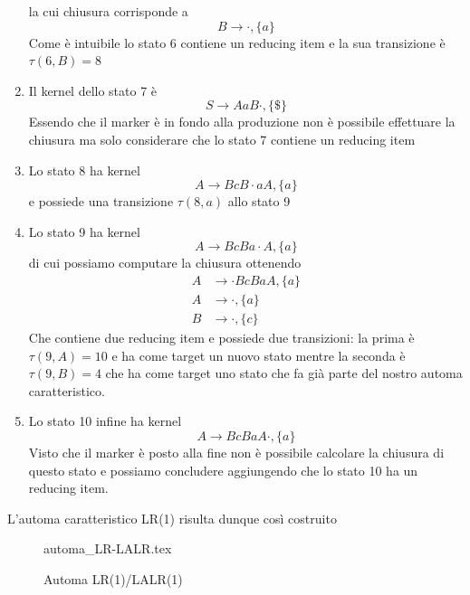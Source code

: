 \documentclass[class=book, crop=false, oneside, 12pt]{standalone}
\begin{document}
\begin{enumerate}
    la cui chiusura corrisponde a 
    \begin{equation*}
         B \to \cdot, \{a\} 
    \end{equation*}
    Come è intuibile lo stato 6 contiene un reducing item e la sua transizione è \(\tau(6, B)=8\)
    \item Il kernel dello stato 7 è 
    \begin{equation*}
         S \to  AaB \cdot, \{\$\}  
    \end{equation*}
    Essendo che il marker è in fondo alla produzione non è possibile effettuare la chiusura ma solo considerare che lo stato 7 contiene un reducing item
    \item Lo stato 8 ha kernel
    \begin{equation*}
        A \to BcB \cdot aA, \{a\} 
    \end{equation*}
    e possiede una transizione \(\tau(8, a)\) allo stato 9
    \item Lo stato 9 ha kernel
    \begin{equation*}
        A \to BcBa \cdot A, \{a\} 
    \end{equation*}
    di cui possiamo computare la chiusura ottenendo
    \begin{align*}
        A &\to \cdot BcBaA, \{a\} \\
        A &\to \cdot, \{a\} \\
        B &\to \cdot, \{c\}
    \end{align*}
    Che contiene due reducing item e possiede due transizioni: la prima è \(\tau(9, A)=10\) e ha come target un nuovo stato mentre la seconda è \(\tau(9, B)=4\) che ha come target uno stato che fa già parte del nostro automa caratteristico.
    \item Lo stato 10 infine ha kernel
    \begin{equation*}
        A \to BcBaA \cdot, \{a\} 
    \end{equation*}
    Visto che il marker è posto alla fine non è possibile calcolare la chiusura di questo stato e possiamo concludere aggiungendo che lo stato 10 ha un reducing item. 
\end{enumerate}

L'automa caratteristico LR(1) risulta dunque così costruito

\begin{figure}[H]
	\centering
	{automa_LR-LALR.tex}
    \caption{Automa LR(1)/LALR(1)}
    \label{fig:lalr-automata}
\end{figure}
\end{document}
